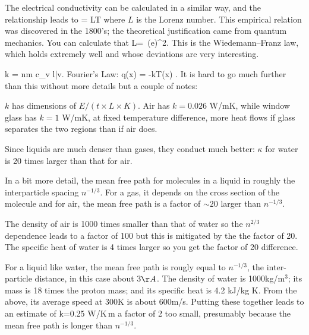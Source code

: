 \documentclass[11pt]{book}
\begin{document}
The electrical conductivity can be calculated in a similar way, and the relationship leads to
\be
\frac{\kappa}{\sigma} = LT\ee
where $L$ is the Lorenz number. This empirical relation was discovered in the 1800's; the theoretical justification came from quantum mechanics. You can calculate that
\be
L= \,\left(e\right)^2.\ee
This is the Wiedemann–Franz law, which holds extremely well and whose deviations are very interesting.


\be
k =  nm c_v l\bar v.\ee
Fourier's Law: \be \vec q(\vec x) = -k\nabla T(\vec x)
.\ee
It is hard to go much further than this without more details but a couple of notes:
\bee
\item $k$ has dimensions of $E/(t\times L\times K)$. Air has $k=0.026$ W/mK, while window glass has $k=1$ W/mK, at fixed temperature difference, more heat flows  if glass separates the two regions than if air does. %
\item Since liquids are much denser than gases, they conduct much better: $\kappa$ for water is 20 times larger than that for air.
\item In a bit more detail, the mean free path for molecules in a liquid in roughly the interparticle spacing $n^{-1/3}$. For a gas, it depends on the cross section of the molecule and for air, the mean free path is a factor of $\sim 20$ larger than $n^{-1/3}$.
\item The density of air is 1000 times smaller than that of water so the $n^{2/3}$ dependence leads to a factor of 100 but this is mitigated by the the factor of 20. The specific heat of water is 4 times larger so you get the factor of 20 difference.
\item For a liquid like water, the mean free path is rougly equal to $n^{-1/3}$, the inter-particle distance, in this case about 3$\AA$. The density of water is 1000kg/m$^3$; its mass is 18 times the proton mass; and its specific heat is 4.2 kJ/kg K. From the above, its average speed at 300K is about 600m/s. Putting these together leads to an estimate of
\be
k=0.25 {\rm W/K\,m}\ee
a factor of 2 too small, presumably because the mean free path is longer than $n^{-1/3}$.
\eee
\end{document}
